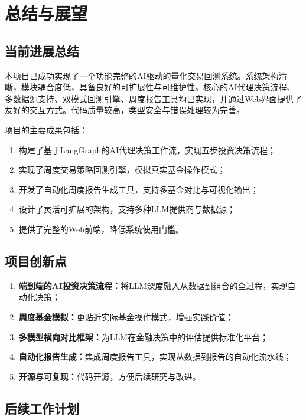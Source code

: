 \documentclass[12pt,a4paper]{ctexart}
\begin{document}
\section{总结与展望}

\subsection{当前进展总结}

本项目已成功实现了一个功能完整的AI驱动的量化交易回测系统。系统架构清晰，模块耦合度低，具备良好的可扩展性与可维护性。核心的AI代理决策流程、多数据源支持、双模式回测引擎、周度报告工具均已实现，并通过Web界面提供了友好的交互方式。代码质量较高，类型安全与错误处理较为完善。

项目的主要成果包括：
\begin{enumerate}
    \item 构建了基于LangGraph的AI代理决策工作流，实现五步投资决策流程；
    \item 实现了周度交易策略回测引擎，模拟真实基金操作模式；
    \item 开发了自动化周度报告生成工具，支持多基金对比与可视化输出；
    \item 设计了灵活可扩展的架构，支持多种LLM提供商与数据源；
    \item 提供了完整的Web前端，降低系统使用门槛。
\end{enumerate}

\subsection{项目创新点}

\begin{enumerate}
    \item \textbf{端到端的AI投资决策流程：}将LLM深度融入从数据到组合的全过程，实现自动化决策；
    \item \textbf{周度基金模拟：}更贴近实际基金操作模式，增强实践价值；
    \item \textbf{多模型横向对比框架：}为LLM在金融决策中的评估提供标准化平台；
    \item \textbf{自动化报告生成：}集成周度报告工具，实现从数据到报告的自动化流水线；
    \item \textbf{开源与可复现：}代码开源，方便后续研究与改进。
\end{enumerate}

\subsection{后续工作计划}
\end{document}
